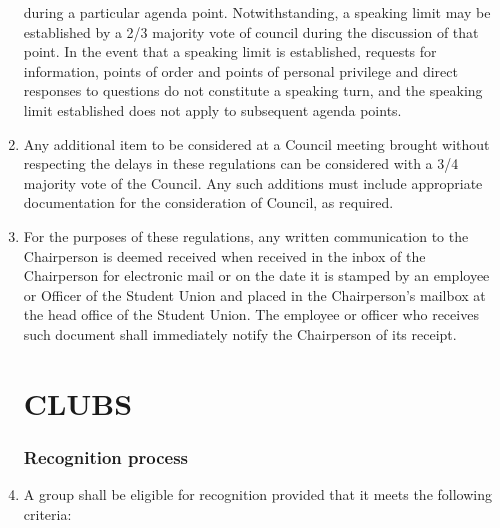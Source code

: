 \documentclass[oneside]{book}
\begin{document}
\begin{enumerate}
during a particular agenda point. Notwithstanding, a speaking limit
may be established by a 2/3 majority vote of council during the discussion
of that point. In the event that a speaking limit is established,
requests for information, points of order and points of personal privilege
and direct responses to questions do not constitute a speaking turn,
and the speaking limit established does not apply to subsequent agenda
points. 
\item Any additional item to be considered at a Council meeting brought
without respecting the delays in these regulations can be considered
with a 3/4 majority vote of the Council. Any such additions must include 
appropriate documentation for the consideration of Council, as required.
\item For the purposes of these regulations, any written communication to
the Chairperson is deemed received when received in the inbox of the
Chairperson for electronic mail or on the date it is stamped by an
employee or Officer of the Student Union and placed in the Chairperson's
mailbox at the head office of the Student Union. The employee or officer
who receives such document shall immediately notify the Chairperson
of its receipt. 

\part{\label{CLUBS}CLUBS }


\section{\label{Recognition_process}Recognition process }
\item A group shall be eligible for recognition provided that it meets the
following criteria: 


\end{enumerate}
\end{document}
